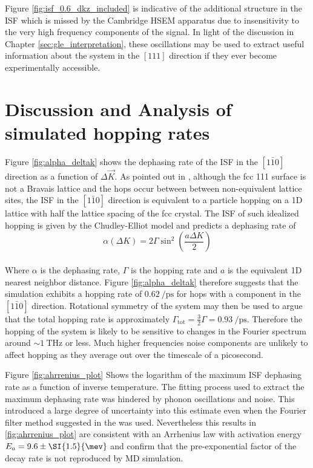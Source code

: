 Figure \ref{fig:isf_0.6_dkz_included} is indicative of the additional structure in the ISF which is missed by the Cambridge HSEM apparatus due to insensitivity to the very high frequency components of the signal. In light of the discussion in Chapter \ref{sec:gle_interpretation}, these oscillations may be used to extract useful information about the system in the $\left[111\right]$ direction if they ever become experimentally accessible.

\section{Discussion and Analysis of simulated hopping rates}

Figure \ref{fig:alpha_deltak} shows the dephasing rate of the ISF in the $\left[1\bar{1}0\right]$ direction as a function of $\Delta{\vec{K}}$. As pointed out in \cite{TUDDENHAM20101459}, although the fcc 111 surface is not a Bravais lattice and the hops occur between between non-equivalent lattice sites, the ISF in the $\left[1\bar{1}0\right]$ direction is equivalent to a particle hopping on a 1D lattice with half the lattice spacing of the fcc crystal. The ISF of such idealized hopping is given by the Chudley-Elliot model and predicts a dephasing rate of
\\
$$
	\alpha\left(\Delta{K}\right) = 2\Gamma\sin^2\left(\frac{a\Delta{K}}{2}\right)
$$
\\
Where $\alpha$ is the dephasing rate, $\Gamma$ is the hopping rate and $a$ is the equivalent 1D nearest neighbor distance. Figure \ref{fig:alpha_deltak} therefore suggests that the simulation exhibits a hopping rate of $\SI{0.62}{\per\pico\second}$ for hops with a component in the $\left[1\bar{1}0\right]$ direction. Rotational symmetry of the system may then be used to argue that the total hopping rate is approximately $\Gamma_{\text{tot}} = \frac{3}{2}\Gamma = \SI{0.93}{\per\pico\second}$. Therefore the hopping of the system is likely to be sensitive to changes in the Fourier spectrum around $\sim\SI{1}{\tera\hertz}$ or less. Much higher frequencies noise components are unlikely to affect hopping as they average out over the timescale of a picosecond. 

Figure \ref{fig:ahrrenius_plot} Shows the logarithm of the maximum ISF dephasing rate as a function of inverse temperature. The fitting process used to extract the maximum dephasing rate was hindered by phonon oscillations and noise. This introduced a large degree of uncertainty into this estimate even when the Fourier filter method suggested in the \cite{Ward} was used. Nevertheless this results in \ref{fig:ahrrenius_plot} are consistent with an Arrhenius law with activation energy $E_a=9.6\pm\SI{1.5}{\mev}$ and confirm that the pre-exponential factor of the decay rate is not reproduced by MD simulation.


